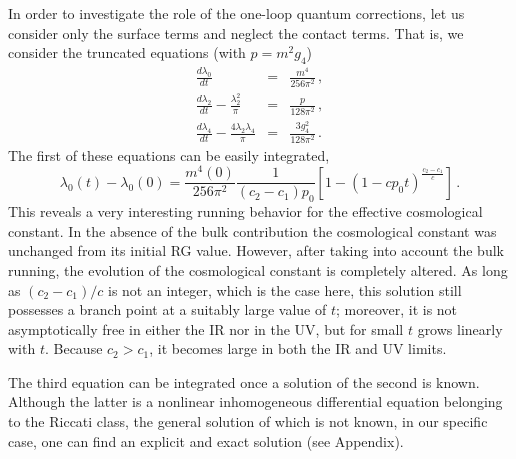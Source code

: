 \documentclass[a4paper,aps,prl,preprint,groupedaddress,showpacs,nobibnotes,tightenlines]{revtex4}
\begin{document}
In order to investigate the role of the one-loop quantum corrections, let us 
consider only the surface terms and neglect the contact terms.
That is, we consider the truncated equations (with $p=m^2g_4$) 
\begin{subequations}
\begin{eqnarray}
\frac{d \lambda_0}{d t}&=&\frac{m^4}{256\pi^2}\,, 
\label{223}
\\
\frac{d \lambda_2}{d t}-\frac{\lambda_2^2}{\pi}&=&
\frac{p}{128\pi^2}\,,
\label{333}
\\
\frac{d \lambda_4}{d t}-\frac{4\lambda_2\lambda_4}{\pi}&=&
\frac{3 g_4^2}{128\pi^2}\,. 
\label{244}
\end{eqnarray}
\end{subequations}
The first of these equations can be easily integrated,
\begin{equation}
\lambda_0(t)- \lambda_0(0)=\frac{ m^4(0)}{256 \pi^2}
\frac{1}{(c_2-c_1)p_0}\left[1- \left(1-cp_0 t\right)
^{\frac{c_2-c_1}{c}}\right]\,.
\label{ee}
\end{equation}
This reveals a very interesting running behavior 
for the effective cosmological constant. In the absence 
of the bulk contribution the cosmological constant
was unchanged from its initial RG value.  However,
after taking into account the bulk running, the evolution of
the cosmological constant is completely altered.
As long as $(c_2-c_1)/c$ is not an integer, which is the case here,
this solution still possesses a branch point at a suitably large value
of $t$; moreover,  it is not asymptotically free in either
the IR nor in the UV, but for small $t$ grows linearly with $t$.
Because $c_2>c_1$, it becomes large in both the IR and UV limits.

The third equation can be integrated once a 
solution of the second is known.
Although the latter is a nonlinear inhomogeneous differential equation 
belonging to the 
Riccati class, the general solution of which is not known, 
in our specific case, one can find an explicit and exact solution
(see Appendix).
\end{document}
